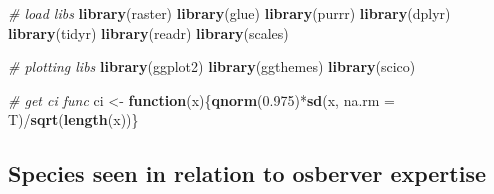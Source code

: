 \documentclass[]{article}
\newenvironment{Shaded}{}{}
\newcommand{\CommentTok}[1]{\textcolor[rgb]{0.38,0.63,0.69}{\textit{#1}}}
\newcommand{\ControlFlowTok}[1]{\textcolor[rgb]{0.00,0.44,0.13}{\textbf{#1}}}
\newcommand{\DataTypeTok}[1]{\textcolor[rgb]{0.56,0.13,0.00}{#1}}
\newcommand{\FloatTok}[1]{\textcolor[rgb]{0.25,0.63,0.44}{#1}}
\newcommand{\KeywordTok}[1]{\textcolor[rgb]{0.00,0.44,0.13}{\textbf{#1}}}
\newcommand{\NormalTok}[1]{#1}
\newcommand{\OperatorTok}[1]{\textcolor[rgb]{0.40,0.40,0.40}{#1}}
\newcommand{\StringTok}[1]{\textcolor[rgb]{0.25,0.44,0.63}{#1}}
\begin{document}
\begin{Shaded}
\begin{Highlighting}[]
\CommentTok{# load libs}
\KeywordTok{library}\NormalTok{(raster)}
\KeywordTok{library}\NormalTok{(glue)}
\KeywordTok{library}\NormalTok{(purrr)}
\KeywordTok{library}\NormalTok{(dplyr)}
\KeywordTok{library}\NormalTok{(tidyr)}
\KeywordTok{library}\NormalTok{(readr)}
\KeywordTok{library}\NormalTok{(scales)}

\CommentTok{# plotting libs}
\KeywordTok{library}\NormalTok{(ggplot2)}
\KeywordTok{library}\NormalTok{(ggthemes)}
\KeywordTok{library}\NormalTok{(scico)}

\CommentTok{# get ci func}
\NormalTok{ci <-}\StringTok{ }\ControlFlowTok{function}\NormalTok{(x)\{}\KeywordTok{qnorm}\NormalTok{(}\FloatTok{0.975}\NormalTok{)}\OperatorTok{*}\KeywordTok{sd}\NormalTok{(x, }\DataTypeTok{na.rm =}\NormalTok{ T)}\OperatorTok{/}\KeywordTok{sqrt}\NormalTok{(}\KeywordTok{length}\NormalTok{(x))\}}
\end{Highlighting}
\end{Shaded}

\begin{Shaded}
\end{Shaded}

\hypertarget{species-seen-in-relation-to-osberver-expertise}{%
\subsection{Species seen in relation to osberver expertise}\label{species-seen-in-relation-to-osberver-expertise}}
\end{document}
